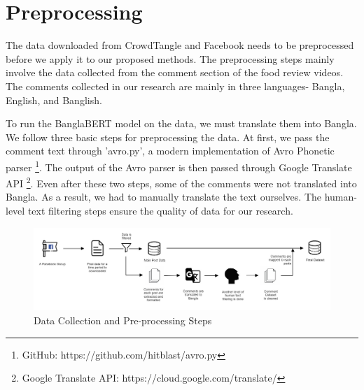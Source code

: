 \chapter{Preprocessing}\label{preprocessing}

The data downloaded from CrowdTangle and Facebook needs to be preprocessed before we apply it to our proposed methods. The preprocessing steps mainly involve the data collected from the comment section of the food review videos. The comments collected in our research are mainly in three languages- Bangla, English, and Banglish.

To run the BanglaBERT model on the data, we must translate them into Bangla. We follow three basic steps for preprocessing the data. At first, we pass the comment text through 'avro.py', a modern implementation of Avro Phonetic parser \footnote{GitHub: https://github.com/hitblast/avro.py}. The output of the Avro parser is then passed through Google Translate API \footnote{Google Translate API: https://cloud.google.com/translate/}. Even after these two steps, some of the comments were not translated into Bangla. As a result, we had to manually translate the text ourselves. The human-level text filtering steps ensure the quality of data for our research.

\begin{figure}[H]
    \includegraphics[width=\linewidth]{figures/process.JPG}
    \caption{Data Collection and Pre-processing Steps}
\end{figure}

